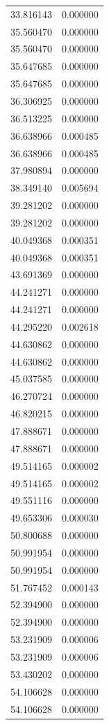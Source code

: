 \begin{longtable}{rr}
33.816143 & 0.000000 \\
35.560470 & 0.000000 \\
35.560470 & 0.000000 \\
35.647685 & 0.000000 \\
35.647685 & 0.000000 \\
36.306925 & 0.000000 \\
36.513225 & 0.000000 \\
36.638966 & 0.000485 \\
36.638966 & 0.000485 \\
37.980894 & 0.000000 \\
38.349140 & 0.005694 \\
39.281202 & 0.000000 \\
39.281202 & 0.000000 \\
40.049368 & 0.000351 \\
40.049368 & 0.000351 \\
43.691369 & 0.000000 \\
44.241271 & 0.000000 \\
44.241271 & 0.000000 \\
44.295220 & 0.002618 \\
44.630862 & 0.000000 \\
44.630862 & 0.000000 \\
45.037585 & 0.000000 \\
46.270724 & 0.000000 \\
46.820215 & 0.000000 \\
47.888671 & 0.000000 \\
47.888671 & 0.000000 \\
49.514165 & 0.000002 \\
49.514165 & 0.000002 \\
49.551116 & 0.000000 \\
49.653306 & 0.000030 \\
50.800688 & 0.000000 \\
50.991954 & 0.000000 \\
50.991954 & 0.000000 \\
51.767452 & 0.000143 \\
52.394900 & 0.000000 \\
52.394900 & 0.000000 \\
53.231909 & 0.000006 \\
53.231909 & 0.000006 \\
53.430202 & 0.000000 \\
54.106628 & 0.000000 \\
54.106628 & 0.000000 \\

\end{longtable}
